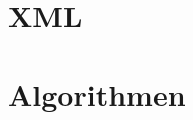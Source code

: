 \documentclass{article}
\begin{document}
\part{XML}

\newpage
\part{Algorithmen}
\newpage

\end{document}
